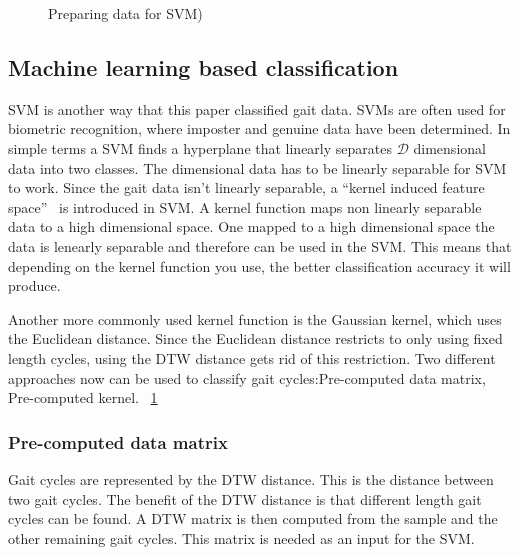 \documentclass{sig-alternate}
\begin{document}
\begin{figure}
\centering
{}
\caption{Preparing data for SVM)}
\label{fig:TrainingData}
\end{figure}

\subsection{Machine learning based classification}
	SVM is another way that this paper classified gait data. SVMs are often used for biometric recognition, where imposter and genuine data have been determined. In simple terms a SVM finds a hyperplane that linearly separates \begin{math}\mathcal{D} \end{math} dimensional data into two classes. The dimensional data has to be linearly separable for SVM to work. Since the gait data isn't linearly separable, a ``kernel induced feature space''~\cite{Muaaz:2013} is introduced in SVM. A kernel function maps non linearly separable data to a high dimensional space. One mapped to a high dimensional space the data is lenearly separable and therefore can be used in the SVM. This means that depending on the kernel function you use, the better classification accuracy it will produce.
%
%

Another more commonly used kernel function is the Gaussian kernel, which uses the Euclidean distance. Since the Euclidean distance restricts to only using fixed length cycles, using the DTW distance gets rid of this restriction. Two different approaches now can be used to classify gait cycles:Pre-computed data matrix, Pre-computed kernel. ~\ref{fig:TrainingData}

\subsubsection{Pre-computed data matrix}
	Gait cycles are represented by the DTW distance. This is the distance between two gait cycles. The benefit of the DTW distance is that different length gait cycles can be found. A DTW matrix is then computed from the sample and the other remaining gait cycles. This matrix is needed as an input for the SVM. 
\end{document}
